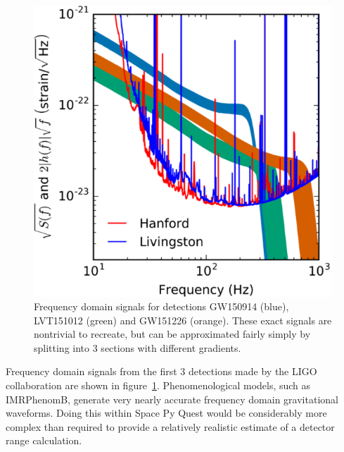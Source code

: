 \documentclass{article}
\begin{document}
\begin{enumerate}
    \begin{figure}
    \centering
    \includegraphics[scale=0.6]{fdomsig.PNG}
    \caption{Frequency domain signals for detections GW150914 (blue),
      LVT151012 (green) and GW151226 (orange). These exact signals are
      nontrivial to recreate, but can be approximated fairly simply by
      splitting into 3 sections with different
      gradients.~\cite{binary}}
    \label{fig:fdomsig}
    \end{figure}
Frequency domain signals from the first 3 detections made by the LIGO
collaboration are shown in figure~\ref{fig:fdomsig}. Phenomenological
models, such as IMRPhenomB, generate very nearly accurate frequency
domain gravitational waveforms. Doing this within Space Py Quest would
be considerably more complex than required to provide a relatively
realistic estimate of a detector range calculation.


\end{enumerate}
\end{document}
